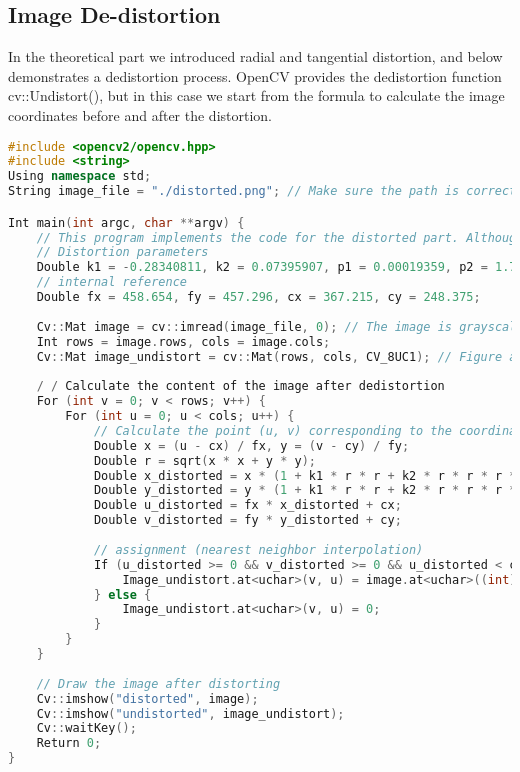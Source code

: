 \subsection{Image De-distortion}

In the theoretical part we introduced radial and tangential distortion, and below demonstrates a dedistortion process. OpenCV provides the dedistortion function cv::Undistort(), but in this case we start from the formula to calculate the image coordinates before and after the distortion.

\begin{lstlisting}[language=C++,caption=slambook/ch5/imageBasics/undistortImage.cpp]
#include <opencv2/opencv.hpp>
#include <string>
Using namespace std;
String image_file = "./distorted.png"; // Make sure the path is correct

Int main(int argc, char **argv) {
	// This program implements the code for the distorted part. Although we can call OpenCV's de-distortion, it's helpful to understand it yourself.
	// Distortion parameters
	Double k1 = -0.28340811, k2 = 0.07395907, p1 = 0.00019359, p2 = 1.76187114e-05;
	// internal reference
	Double fx = 458.654, fy = 457.296, cx = 367.215, cy = 248.375;
	
	Cv::Mat image = cv::imread(image_file, 0); // The image is grayscale, CV_8UC1
	Int rows = image.rows, cols = image.cols;
	Cv::Mat image_undistort = cv::Mat(rows, cols, CV_8UC1); // Figure after de-distortion
	
	/ / Calculate the content of the image after dedistortion
	For (int v = 0; v < rows; v++) {
		For (int u = 0; u < cols; u++) {
			// Calculate the point (u, v) corresponding to the coordinates in the distorted image (u_distorted, v_distorted) according to the formula
			Double x = (u - cx) / fx, y = (v - cy) / fy;
			Double r = sqrt(x * x + y * y);
			Double x_distorted = x * (1 + k1 * r * r + k2 * r * r * r * r) + 2 * p1 * x * y + p2 * (r * r + 2 * x * x);
			Double y_distorted = y * (1 + k1 * r * r + k2 * r * r * r * r) + p1 * (r * r + 2 * y * y) + 2 * p2 * x * y;
			Double u_distorted = fx * x_distorted + cx;
			Double v_distorted = fy * y_distorted + cy;
			
			// assignment (nearest neighbor interpolation)
			If (u_distorted >= 0 && v_distorted >= 0 && u_distorted < cols && v_distorted < rows) {
				Image_undistort.at<uchar>(v, u) = image.at<uchar>((int) v_distorted, (int) u_distorted);
			} else {
				Image_undistort.at<uchar>(v, u) = 0;
			}
		}
	}
	
	// Draw the image after distorting
	Cv::imshow("distorted", image);
	Cv::imshow("undistorted", image_undistort);
	Cv::waitKey();
	Return 0;
}
\end{lstlisting}